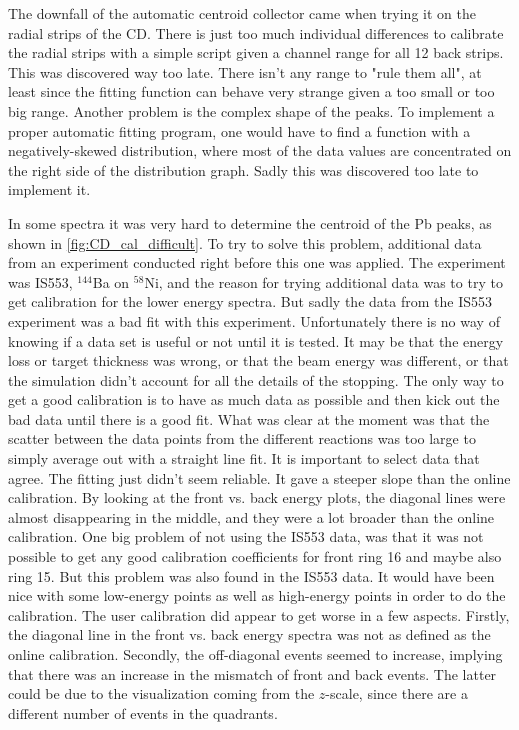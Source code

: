 \documentclass[twoside,english]{uiofysmaster/uiofysmaster}
\let\orgautoref\autoref
\renewcommand{\autoref}
        {%
		 \def\sectionautorefname{Section}%
		 \def\subsectionautorefname{Section}%
		 \def\subsubsectionautorefname{Section}%
		 \def\chapterautorefname{Chapter}%
          \orgautoref}
\begin{document}
The downfall of the automatic centroid collector came when trying it on the radial strips of the CD. 
There is just too much individual differences to calibrate the radial strips with a simple script given a channel range for all 12 back strips. 
This was discovered way too late. 
There isn't any range to "rule them all", at least since the fitting function can behave very strange given a too small or too big range.
Another problem is the complex shape of the peaks.
To implement a proper automatic fitting program, one would have to find a function with a negatively-skewed distribution, where most of the data values are concentrated on the right side of the distribution graph. 
Sadly this was discovered too late to implement it. 

In some spectra it was very hard to determine the centroid of the Pb peaks, as shown in \autoref{fig:CD_cal_difficult}. 
To try to solve this problem, additional data from an experiment conducted right before this one was applied. 
The experiment was IS553, $^{144}$Ba on $^{58}$Ni, and the reason for trying additional data was to try to get calibration for the lower energy spectra. 
But sadly the data from the IS553 experiment was a bad fit with this experiment. 
Unfortunately there is no way of knowing if a data set is useful or not until it is tested. 
It may be that the energy loss or target thickness was wrong, or that the beam energy was different, or that the simulation didn't account for all the details of the stopping. 
The only way to get a good calibration is to have as much data as possible and then kick out the bad data until there is a good fit. 
What was clear at the moment was that the scatter between the data points from the different reactions was too large to simply average out with a straight line fit. 
It is important to select data that agree.
The fitting just didn't seem reliable.
It gave a steeper slope than the online calibration.
By looking at the front vs. back energy plots, the diagonal lines were almost disappearing in the middle, and they were a lot broader than the online calibration. 
One big problem of not using the IS553 data, was that it was not possible to get any good calibration coefficients for front ring 16 and maybe also ring 15.
But this problem was also found in the IS553 data.
It would have been nice with some low-energy points as well as high-energy points in order to do the calibration. 
The user calibration did appear to get worse in a few aspects. 
Firstly, the diagonal line in the front vs. back energy spectra was not as defined as the online calibration.
Secondly, the off-diagonal events seemed to increase, implying that there was an increase in the mismatch of front and back events. 
The latter could be due to the visualization coming from the $z$-scale, since there are a different number of events in the quadrants. 
\end{document}
